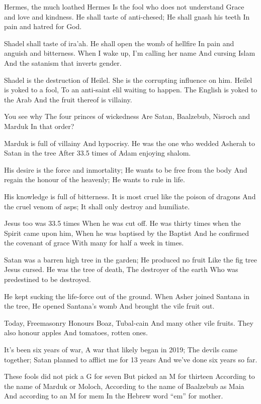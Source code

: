 \documentclass[
]{book}
\begin{document}
Hermes, the much loathed Hermes
Is the fool who does not understand
Grace and love and kindness.
He shall taste of anti-chesed;
He shall gnash his teeth
In pain and hatred for God.

Shadel shall taste of ira'ah.
He shall open the womb of hellfire
In pain and anguish and bitterness.
When I wake up, I'm calling her name
And cursing Islam
And the satanism that inverts gender.

Shadel is the destruction of Heilel.
She is the corrupting influence on him.
Heilel is yoked to a fool,
To an anti-saint elil waiting to happen.
The English is yoked to the Arab
And the fruit thereof is villainy.

You see why
The four princes of wickedness
Are Satan, Baalzebub, Nisroch and Marduk
In that order?

Marduk is full of villainy
And hypocrisy.
He was the one who wedded
Asherah to Satan in the tree
After 33.5 times of Adam enjoying shalom.

His desire is the force and inmortality;
He wants to be free from the body
And regain the honour of the heavenly;
He wants to rule in life.

His knowledge is full of bitterness.
It is most cruel like the poison of dragons
And the cruel venom of asps;
It shall only destroy and humiliate.

Jesus too was 33.5 times
When he was cut off.
He was thirty times when the Spirit came upon him,
When he was baptised by the Baptist
And he confirmed the covenant of grace
With many for half a week in times.

Satan was a barren high tree in the garden;
He produced no fruit
Like the fig tree Jesus cursed.
He was the tree of death,
The destroyer of the earth
Who was predestined to be destroyed.

He kept sucking the life-force out of the ground.
When Asher joined Santana in the tree,
He opened Santana's womb
And brought the vile fruit out.

Today, Freemasonry
Honours Boaz, Tubal-cain
And many other vile fruits.
They also honour apples
And tomatoes, rotten ones.

It's been six years of war,
A war that likely began in 2019;
The devils came together;
Satan planned to afflict me for 13 years
And we've done six years so far.

These fools did not pick a G for seven
But picked an M for thirteen
According to the name of Marduk or Moloch,
According to the name of Baalzebub as Maia
And according to an M for mem
In the Hebrew word ``em'' for mother.
\end{document}
